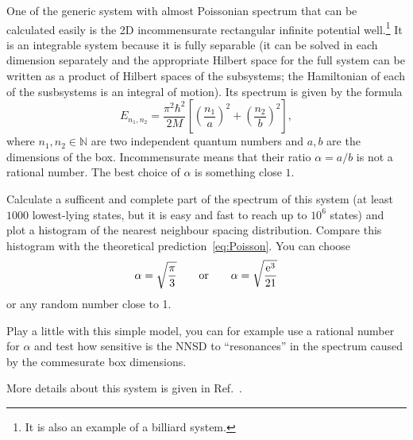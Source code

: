 \documentclass[a4paper,11pt,twoside]{article}
\begin{document}
        \begin{task}\label{task:2Dbox}
            One of the generic system with almost Poissonian spectrum that can be calculated easily is the 2D incommensurate rectangular infinite potential well.\footnote{It is also an example of a billiard system.}
            It is an integrable system because it is fully separable (it can be solved in each dimension separately and the appropriate Hilbert space for the full system can be written as a product of Hilbert spaces of the subsystems; the Hamiltonian of each of the susbsystems is an integral of motion).
            Its spectrum is given by the formula
            \begin{equation}
                E_{n_{1},n_{2}}
                =\frac{\pi^{2}\hbar^{2}}{2M}\left[\left(\frac{n_{1}}{a}\right)^{2}+\left(\frac{n_{2}}{b}\right)^{2}\right],
                \label{eq:2Dbox}
            \end{equation}
            where $n_{1},n_{2}\in\mathbb{N}$ are two independent quantum numbers and $a,b$ are the dimensions of the box.
            Incommensurate means that their ratio $\alpha=a/b$ is not a rational number.
            The best choice of $\alpha$ is something close $1$.

            Calculate a sufficent and complete part of the spectrum of this system (at least $1000$ lowest-lying states, but it is easy and fast to reach up to $10^6$ states) and plot a histogram of the nearest neighbour spacing distribution.
            Compare this histogram with the theoretical prediction~\eqref{eq:Poisson}.
            You can choose
            \begin{equation}
                \alpha=\sqrt{\frac{\pi}{3}}\qquad\text{or}\qquad\alpha=\sqrt{\frac{\operatorname{e}^{3}}{21}}
            \end{equation}
            or any random number close to 1.

            Play a little with this simple model, you can for example use a rational number for $\alpha$ and test how sensitive is the NNSD to ``resonances'' in the spectrum caused by the commesurate box dimensions.

            More details about this system is given in Ref.~\cite{Cas85}.
        \end{task}
\end{document}
